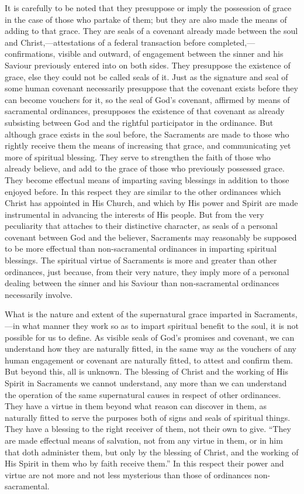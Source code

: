 \documentclass[]{book}
\begin{document}
It is carefully to be noted that they presuppose or imply the possession of grace in the case of those who partake of them; but they are also made the means of adding to that grace. They are seals of a covenant already made between the soul and Christ,---attestations of a federal transaction before completed,---confirmations, visible and outward, of engagement between the sinner and his Saviour previously entered into on both sides. They presuppose the existence of grace, else they could not be called seals of it. Just as the signature and seal of some human covenant necessarily presuppose that the covenant exists before they can become vouchers for it, so the seal of God's covenant, affirmed by means of sacramental ordinances, presupposes the existence of that covenant as already subsisting between God and the rightful participator in the ordinance. But although grace exists in the soul before, the Sacraments are made to those who rightly receive them the means of increasing that grace, and communicating yet more of spiritual blessing. They serve to strengthen the faith of those who already believe, and add to the grace of those who previously possessed grace. They become effectual means of imparting saving blessings in addition to those enjoyed before. In this respect they are similar to the other ordinances which Christ has appointed in His Church, and which by His power and Spirit are made instrumental in advancing the interests of His people. But from the very peculiarity that attaches to their distinctive character, as seals of a personal covenant between God and the believer, Sacraments may reasonably be supposed to be more effectual than non-sacramental ordinances in imparting spiritual blessings. The spiritual virtue of Sacraments is more and greater than other ordinances, just because, from their very nature, they imply more of a personal dealing between the sinner and his Saviour than non-sacramental ordinances necessarily involve.

What is the nature and extent of the supernatural grace imparted in Sacraments,---in what manner they work so as to impart spiritual benefit to the soul, it is not possible for us to define. As visible seals of God's promises and covenant, we can understand how they are naturally fitted, in the same way as the vouchers of any human engagement or covenant are naturally fitted, to attest and confirm them. But beyond this, all is unknown. The blessing of Christ and the working of His Spirit in Sacraments we cannot understand, any more than we can understand the operation of the same supernatural causes in respect of other ordinances. They have a virtue in them beyond what reason can discover in them, as naturally fitted to serve the purposes both of signs and seals of spiritual things. They have a blessing to the right receiver of them, not their own to give. ``They are made effectual means of salvation, not from any virtue in them, or in him that doth administer them, but only by the blessing of Christ, and the working of His Spirit in them who by faith receive them.'' In this respect their power and virtue are not more and not less mysterious than those of ordinances non-sacramental.
\end{document}
